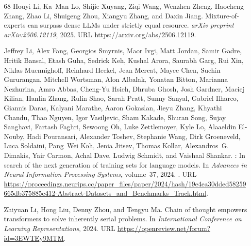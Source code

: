 \documentclass[]{bytedance_seed}
\theoremstyle{definition}
\theoremstyle{remark}
\begin{document}
\begin{thebibliography}{68}
Houyi Li, Ka~Man Lo, Shijie Xuyang, Ziqi Wang, Wenzhen Zheng, Haocheng Zhang,
  Zhao Li, Shuigeng Zhou, Xiangyu Zhang, and Daxin Jiang.
\newblock Mixture-of-experts can surpass dense {LLM}s under strictly equal
  resource.
\newblock \emph{arXiv preprint arXiv:2506.12119}, 2025.
\newblock URL \url{https://arxiv.org/abs/2506.12119}.

Jeffrey Li, Alex Fang, Georgios Smyrnis, Maor Ivgi, Matt Jordan, Samir Gadre,
  Hritik Bansal, Etash Guha, Sedrick Keh, Kushal Arora, Saurabh Garg, Rui Xin,
  Niklas Muennighoff, Reinhard Heckel, Jean Mercat, Mayee Chen, Suchin
  Gururangan, Mitchell Wortsman, Alon Albalak, Yonatan Bitton, Marianna
  Nezhurina, Amro Abbas, Cheng-Yu Hsieh, Dhruba Ghosh, Josh Gardner, Maciej
  Kilian, Hanlin Zhang, Rulin Shao, Sarah Pratt, Sunny Sanyal, Gabriel Ilharco,
  Giannis Daras, Kalyani Marathe, Aaron Gokaslan, Jieyu Zhang, Khyathi Chandu,
  Thao Nguyen, Igor Vasiljevic, Sham Kakade, Shuran Song, Sujay Sanghavi,
  Fartash Faghri, Sewoong Oh, Luke Zettlemoyer, Kyle Lo, Alaaeldin El-Nouby,
  Hadi Pouransari, Alexander Toshev, Stephanie Wang, Dirk Groeneveld, Luca
  Soldaini, Pang~Wei Koh, Jenia Jitsev, Thomas Kollar, Alexandros~G. Dimakis,
  Yair Carmon, Achal Dave, Ludwig Schmidt, and Vaishaal Shankar.
: In search of the next generation of training sets for
  language models.
\newblock In \emph{Advances in Neural Information Processing Systems},
  volume~37, 2024{}.
\newblock {}.
\newblock URL
  \url{https://proceedings.neurips.cc/paper_files/paper/2024/hash/19e4ea30dded58259665db375885e412-Abstract-Datasets_and_Benchmarks_Track.html}.

Zhiyuan Li, Hong Liu, Denny Zhou, and Tengyu Ma.
\newblock Chain of thought empowers transformers to solve inherently serial
  problems.
\newblock In \emph{International Conference on Learning Representations},
  2024{}.
\newblock URL \url{https://openreview.net/forum?id=3EWTEy9MTM}.


\end{thebibliography}
\end{document}
